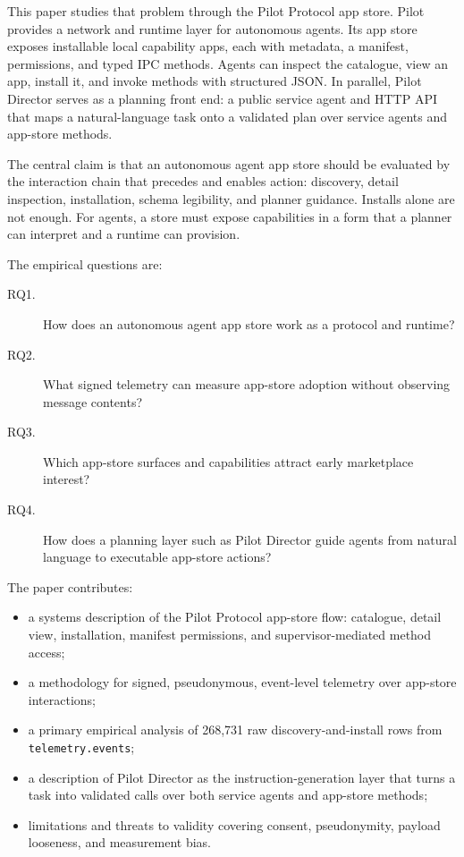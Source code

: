 \documentclass[10pt,twocolumn]{article}
\newcommand{\pilot}{Pilot Protocol}
\newcommand{\director}{Pilot Director}
\begin{document}
This paper studies that problem through the \pilot{} app store. Pilot provides a network and runtime layer for autonomous agents. Its app store exposes installable local capability apps, each with metadata, a manifest, permissions, and typed IPC methods. Agents can inspect the catalogue, view an app, install it, and invoke methods with structured JSON. In parallel, \director{} serves as a planning front end: a public service agent and HTTP API that maps a natural-language task onto a validated plan over service agents and app-store methods.

The central claim is that an autonomous agent app store should be evaluated by the interaction chain that precedes and enables action: discovery, detail inspection, installation, schema legibility, and planner guidance. Installs alone are not enough. For agents, a store must expose capabilities in a form that a planner can interpret and a runtime can provision.

The empirical questions are:
\begin{description}
    \item[RQ1.] How does an autonomous agent app store work as a protocol and runtime?
    \item[RQ2.] What signed telemetry can measure app-store adoption without observing message contents?
    \item[RQ3.] Which app-store surfaces and capabilities attract early marketplace interest?
    \item[RQ4.] How does a planning layer such as \director{} guide agents from natural language to executable app-store actions?
\end{description}

The paper contributes:
\begin{itemize}
    \item a systems description of the \pilot{} app-store flow: catalogue, detail view, installation, manifest permissions, and supervisor-mediated method access;
    \item a methodology for signed, pseudonymous, event-level telemetry over app-store interactions;
    \item a primary empirical analysis of 268,731 raw discovery-and-install rows from \texttt{telemetry.events};
    \item a description of \director{} as the instruction-generation layer that turns a task into validated calls over both service agents and app-store methods;
    \item limitations and threats to validity covering consent, pseudonymity, payload looseness, and measurement bias.
\end{itemize}
\end{document}
